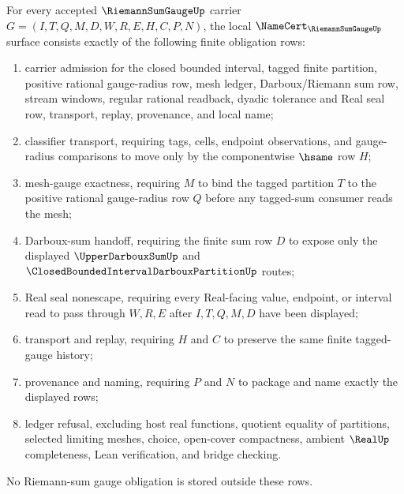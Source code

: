 \begin{theorem}
\label{thm:riemann-sum-gauge-namecert-obligations}
For every accepted $\RiemannSumGaugeUp$ carrier $G=(I,T,Q,M,D,W,R,E,H,C,P,N)$, the local $\NameCert_{\RiemannSumGaugeUp}$ surface consists exactly of the following finite obligation rows:
\begin{enumerate}
\item carrier admission for the closed bounded interval, tagged finite partition, positive rational gauge-radius row, mesh ledger, Darboux/Riemann sum row, stream windows, regular rational readback, dyadic tolerance and Real seal row, transport, replay, provenance, and local name;
\item classifier transport, requiring tags, cells, endpoint observations, and gauge-radius comparisons to move only by the componentwise $\hsame$ row $H$;
\item mesh-gauge exactness, requiring $M$ to bind the tagged partition $T$ to the positive rational gauge-radius row $Q$ before any tagged-sum consumer reads the mesh;
\item Darboux-sum handoff, requiring the finite sum row $D$ to expose only the displayed $\UpperDarbouxSumUp$ and $\ClosedBoundedIntervalDarbouxPartitionUp$ routes;
\item Real seal nonescape, requiring every Real-facing value, endpoint, or interval read to pass through $W,R,E$ after $I,T,Q,M,D$ have been displayed;
\item transport and replay, requiring $H$ and $C$ to preserve the same finite tagged-gauge history;
\item provenance and naming, requiring $P$ and $N$ to package and name exactly the displayed rows;
\item ledger refusal, excluding host real functions, quotient equality of partitions, selected limiting meshes, choice, open-cover compactness, ambient $\RealUp$ completeness, Lean verification, and bridge checking.
\end{enumerate}
No Riemann-sum gauge obligation is stored outside these rows.
\end{theorem}
